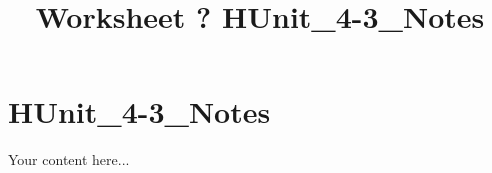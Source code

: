 \documentclass{article}
\title{Worksheet ? HUnit_4-3_Notes}
\begin{document}
\maketitle
\section*{HUnit_4-3_Notes}
Your content here...\\
\end{document}
